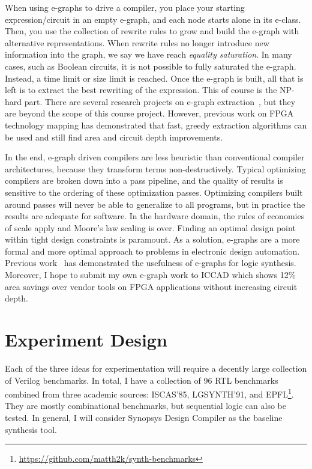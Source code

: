\documentclass[10pt,letterpaper]{article}
\begin{document}
When using e-graphs to drive a compiler, you place your starting
expression/circuit in an empty e-graph, and each node starts alone in its
e-class. Then, you use the collection of rewrite rules to grow and build the
e-graph with alternative representations. When rewrite rules no longer
introduce new information into the graph, we say we have reach \textit{equality
    saturation}. In many cases, such as Boolean circuits, it is not possible to
fully saturated the e-graph. Instead, a time limit or size limit is reached.
Once the e-graph is built, all that is left is to extract the best rewriting of
the expression. This of course is the NP-hard part. There are several research
projects on e-graph extraction~\cite{smoothe,sparsextract}, but they are beyond
the scope of this course project. However, previous work on FPGA technology
mapping has demonstrated that fast, greedy extraction algorithms can be used
and still find area and circuit depth improvements.

In the end, e-graph driven compilers are less heuristic than conventional
compiler architectures, because they transform terms non-destructively. Typical
optimizing compilers are broken down into a pass pipeline, and the quality of
results is sensitive to the ordering of these optimization passes. Optimizing
compilers built around passes will never be able to generalize to all programs,
but in practice the results are adequate for software. In the hardware domain,
the rules of economies of scale apply and Moore's law scaling is over. Finding
an optimal design point within tight design constraints is paramount. As a
solution, e-graphs are a more formal and more optimal approach to problems in
electronic design automation. Previous work~\cite{esyn} has demonstrated the
usefulness of e-graphs for logic synthesis. Moreover, I hope to submit my own
e-graph work to ICCAD which shows 12\% area savings over vendor tools on FPGA
applications without increasing circuit depth.

\section{Experiment Design}\label{sec:experiments}

Each of the three ideas for experimentation will require a decently large
collection of Verilog benchmarks. In total, I have a collection of 96 RTL
benchmarks combined from three academic sources: ISCAS'85, LGSYNTH'91, and
EPFL\footnote{\href{https://github.com/matth2k/synth-benchmarks}{https://github.com/matth2k/synth-benchmarks}}.
They are mostly combinational benchmarks, but sequential logic can also be
tested. In general, I will consider Synopsys Design Compiler as the baseline
synthesis tool.
\end{document}
